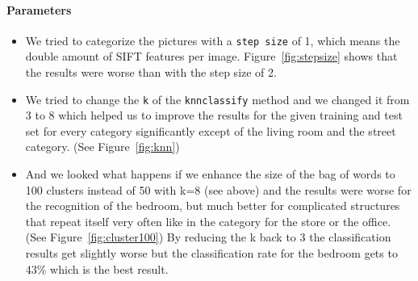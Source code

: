 \documentclass[subfigure,epsfig,fleqn,float,numbers=noenddot]{scrartcl}
\begin{document}
\paragraph{Parameters}

\begin{itemize}
	\item We tried to categorize the pictures with a \texttt{step size} of 1, which means the double amount of SIFT features per image. Figure~\ref{fig:stepsize} shows that the results were worse than with the step size of 2. 
	\item We tried to change the \texttt{k} of the \texttt{knnclassify} method and we changed it from 3 to 8 which helped us to improve the results for the given training and test set for every category significantly except of the living room and the street category. (See Figure~\ref{fig:knn})
	\item And we looked what happens if we enhance the size of the bag of words to 100 clusters instead of 50 with k=8 (see above) and the results were worse for the recognition of the bedroom, but much better for complicated structures that repeat itself very often like in the category for the store or the office. (See Figure~\ref{fig:cluster100}) By reducing the k back to 3 the classification results get slightly worse but the classification rate for the bedroom gets to 43\% which is the best result.
\end{itemize} 
\end{document}
